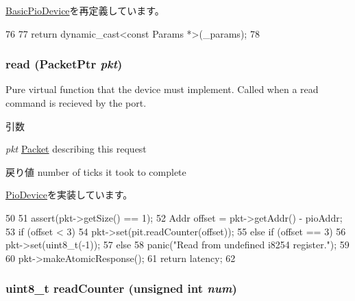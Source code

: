 \hyperlink{classBasicPioDevice_acd3c3feb78ae7a8f88fe0f110a718dff}{BasicPioDevice}を再定義しています。


\begin{DoxyCode}
76     {
77         return dynamic_cast<const Params *>(_params);
78     }
\end{DoxyCode}
\hypertarget{classX86ISA_1_1I8254_a613ec7d5e1ec64f8d21fec78ae8e568e}{
\subsubsection[{read}]{ read ({\bf PacketPtr} {\em pkt})}}
\label{classX86ISA_1_1I8254_a613ec7d5e1ec64f8d21fec78ae8e568e}
Pure virtual function that the device must implement. Called when a read command is recieved by the port. 
\begin{DoxyParams}{引数}
\item[{\em pkt}]\hyperlink{classPacket}{Packet} describing this request \end{DoxyParams}
\begin{DoxyReturn}{戻り値}
number of ticks it took to complete 
\end{DoxyReturn}


\hyperlink{classPioDevice_a842312590432036092c422c87a442358}{PioDevice}を実装しています。


\begin{DoxyCode}
50 {
51     assert(pkt->getSize() == 1);
52     Addr offset = pkt->getAddr() - pioAddr;
53     if (offset < 3) {
54         pkt->set(pit.readCounter(offset));
55     } else if (offset == 3) {
56         pkt->set(uint8_t(-1));
57     } else {
58         panic("Read from undefined i8254 register.\n");
59     }
60     pkt->makeAtomicResponse();
61     return latency;
62 }
\end{DoxyCode}
\hypertarget{classX86ISA_1_1I8254_a4794298e519275c38d6d8a8f169fd53b}{
\subsubsection[{readCounter}]{\setlength{\rightskip}{0pt plus 5cm}uint8\_\-t readCounter (unsigned int {\em num})}}
\label{classX86ISA_1_1I8254_a4794298e519275c38d6d8a8f169fd53b}



